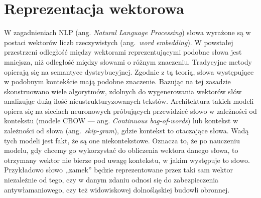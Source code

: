 
\chapter{Reprezentacja wektorowa}
	W zagadnieniach NLP (ang. \emph{Natural Language Processing}) słowa wyrażone są w postaci wektorów liczb rzeczywistych (ang.\ \emph{word embedding}).
	W powstałej przestrzeni odległość między wektorami reprezentującymi podobne słowa jest mniejsza, niż odległość między słowami o różnym znaczeniu.
	Tradycyjne metody opierają się na semantyce dystrybucyjnej.
	Zgodnie z tą teorią, słowa występujące w podobnym kontekście mają podobne znaczenie.
	Bazując na tej zasadzie skonstruowano wiele algorytmów, zdolnych do wygenerowania wektorów słów analizując dużą ilość nieustrukturyzowanych tekstów.
	Architektura takich modeli opiera się na sieciach neuronowych próbujących przewidzieć słowo w zależności od kontekstu
		(modele CBOW --- ang. \emph{Continuous bag-of-words}) lub kontekst w zależności od słowa (ang.\ \emph{skip-gram})\cite{word2vec}, gdzie kontekst to otaczające słowa.
	Wadą tych modeli jest fakt, że są one niekontekstowe.
	Oznacza to, że po nauczeniu modelu, gdy chcemy go wykorzystać do obliczenia wektora danego słowa, to otrzymany wektor nie bierze pod uwagę kontekstu, w jakim występuje to słowo.
	Przykładowo słowo ,,zamek'' będzie reprezentowane przez taki sam wektor niezależnie od tego,
		czy w danym zdaniu odnosi się do zabezpieczenia antywłamaniowego, czy też widowiskowej dolnośląskiej budowli obronnej.
	
